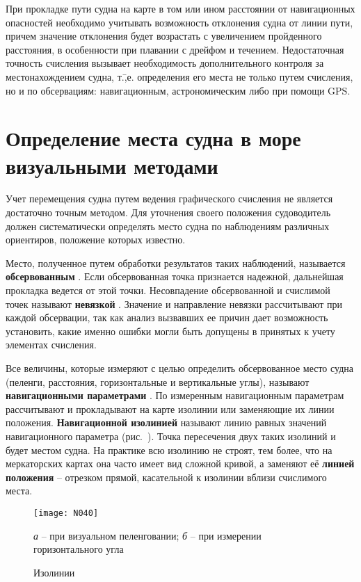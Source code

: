При прокладке пути судна на карте в том или ином расстоянии от
навигационных опасностей необходимо учитывать возможность отклонения
судна от линии пути, причем значение отклонения будет возрастать с
увеличением пройденного расстояния, в особенности при плавании с
дрейфом и течением. Недостаточная точность счисления вызывает
необходимость дополнительного контроля за местонахождением судна,
т.\=,е. определения его места не только путем счисления, но и по
обсервациям: навигационным, астрономическим либо при помощи GPS.

\section{Определение места судна в море визуальными методами}

Учет перемещения судна путем ведения графического счисления не
является достаточно точным методом. Для уточнения своего положения
судоводитель должен систематически определять место судна по
наблюдениям различных ориентиров, положение которых известно.

Место, полученное путем обработки результатов таких наблюдений,
называется \textbf{обсервованным} . Если
обсервованная точка признается надежной, дальнейшая прокладка ведется
от этой точки. Несовпадение обсервованной и счислимой точек называют
\textbf{невязкой} . Значение и направление невязки
рассчитывают при каждой обсервации, так как анализ вызвавших ее причин
дает возможность установить, какие именно ошибки могли быть допущены в
принятых к учету элементах счисления.

Все величины, которые измеряют с целью определить обсервованное место
судна (пеленги, расстояния, горизонтальные и вертикальные углы),
называют \textbf{навигационными параметрами}
. По измеренным
навигационным параметрам рассчитывают и прокладывают на карте изолинии
или заменяющие их линии положения.
\textbf{Навигационной изолинией} 
называют линию равных значений навигационного параметра
(рис.~). Точка пересечения двух таких изолиний и будет местом
судна. На практике всю изолинию не строят, тем более, что на
меркаторских картах она часто имеет вид сложной кривой, а заменяют её
\textbf{линией положения} 
\--- отрезком прямой, касательной к изолинии вблизи счислимого места.

\begin{figure*}[htb]
  \centering{}
  \texttt{[image: N040]}
  \caption{Изолинии}
  \label{fig:N40}
  \small
  \centering{}
  \textit{а} \--- при визуальном пеленговании; \textit{б} \--- при измерении горизонтального угла
\end{figure*}

